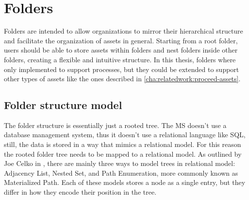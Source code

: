 
%

\section{Folders}
\label{cha:conceptanddesign:folders}

Folders are intended to allow organizations to mirror their hierarchical structure and
facilitate the organization of assets in general.
Starting from a root folder, users should be able to store assets within folders and nest
folders inside other folders, creating a flexible and intuitive structure. 
In this thesis, folders where only implemented to support processes, but they could be extended to
support other types of assets like the ones described in \ref{cha:relatedwork:proceed-assets}.

\subsection{Folder structure model}


The folder structure is essentially just a rooted tree.
The MS doesn't use a database management system, thus it doesn't use a relational
language like SQL, still, the data is stored in a way that mimics a relational model.
For this reason the rooted folder tree needs to be mapped to a relational model.
%
As outlined by Joe Celko in \cite{celkoSQLTrees}, there are mainly three ways to model
trees in relational model:
Adjacency List, Nested Set, and  Path Enumeration, more commonly known as Materialized Path.
Each of these models stores a node as a single entry, but they differ in how they encode
their position in the tree.


